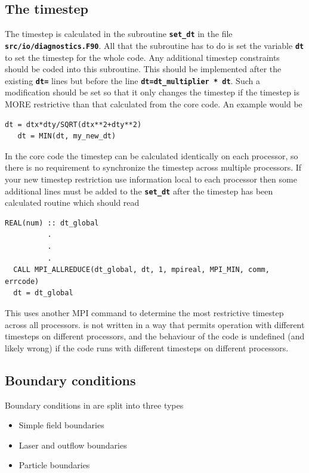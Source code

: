 \documentclass[12pt,a4paper]{article}
\newcommand{\simpleboxverbatim}{\begin{Verbatim}[obeytabs=true,frame=single,
  framerule=0.5mm,rulecolor=\color{warwickmid},formatcom=\color{black}]}
\newcommand{\inlinecode}[1]{{\color{warwickred} \bf\texttt{#1}}}
\newcommand{\EPOCH}{{\color{warwickdark}\fontfamily{phv}\selectfont{EPOCH}}}
\begin{document}
\subsection{The timestep}

The timestep is calculated in the subroutine \inlinecode{set\_dt} in the file
\inlinecode{src/io/diagnostics.F90}. All that the subroutine has to do is set
the variable \inlinecode{dt} to set the timestep for the whole code. Any
additional timestep constraints should be coded into this subroutine. This
should be implemented after the existing \inlinecode{dt=} lines but before the
line \inlinecode{dt=dt\_multiplier * dt}. Such a modification should be set so
that it only changes the timestep if the timestep is MORE restrictive than that
calculated from the core code. An example would be

\simpleboxverbatim
   dt = dtx*dty/SQRT(dtx**2+dty**2)
   dt = MIN(dt, my_new_dt)
\end{Verbatim}

In the core {\EPOCH} code the timestep can be calculated identically on each
processor, so there is no requirement to synchronize the timestep across
multiple processors. If your new timestep restriction use information local to
each processor then some additional lines must be added to the
\inlinecode{set\_dt} after the timestep has been calculated routine which
should read

\simpleboxverbatim
  REAL(num) :: dt_global
          .
          .
          .
  CALL MPI_ALLREDUCE(dt_global, dt, 1, mpireal, MPI_MIN, comm, errcode)
  dt = dt_global
\end{Verbatim}

This uses another MPI command to determine the most restrictive timestep across
all processors. {\EPOCH} is not written in a way that permits operation with
different timesteps on different processors, and the behaviour of the code is
undefined (and likely wrong) if the code runs with different timesteps on
different processors.

\subsection{Boundary conditions}
Boundary conditions in {\EPOCH} are split into three types
\begin{itemize}
\item Simple field boundaries
\item Laser and outflow boundaries
\item Particle boundaries
\end{itemize}
\end{document}
